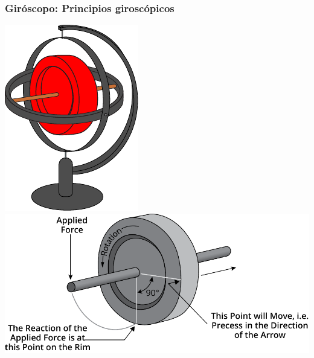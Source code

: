 \begin{frame}
    \frametitle{Giróscopo: Principios giroscópicos}
    \scriptsize
    
    \begin{center}
        \hspace{1em}
        \includegraphics[width=0.15\columnwidth]{images/gyroscope.pdf}
        \hspace{1em}
        \includegraphics[width=0.4\columnwidth]{images/gyroscope_precession.pdf}
    \end{center}


\end{frame}
